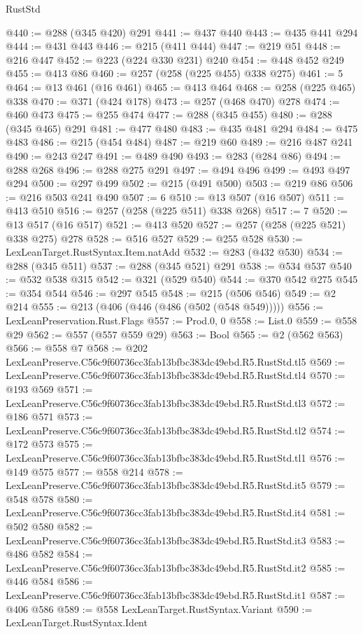 \begin{lexlean}{RustStd}
\begin{coremodule}
@440 := @288 (@345 @420) @291
@441 := @437 @440
@443 := @435 @441 @294
@444 := @431 @443
@446 := @215 (@411 @444)
@447 := @219 @51
@448 := @216 @447
@452 := @223 (@224 @330 @231) @240
@454 := @448 @452 @249
@455 := @413 @86
@460 := @257 (@258 (@225 @455) @338 @275)
@461 := 5
@464 := @13 @461 (@16 @461)
@465 := @413 @464
@468 := @258 (@225 @465) @338
@470 := @371 (@424 @178)
@473 := @257 (@468 @470) @278
@474 := @460 @473
@475 := @255 @474
@477 := @288 (@345 @455)
@480 := @288 (@345 @465) @291
@481 := @477 @480
@483 := @435 @481 @294
@484 := @475 @483
@486 := @215 (@454 @484)
@487 := @219 @60
@489 := @216 @487 @241
@490 := @243 @247
@491 := @489 @490
@493 := @283 (@284 @86)
@494 := @288 @268
@496 := @288 @275 @291
@497 := @494 @496
@499 := @493 @497 @294
@500 := @297 @499
@502 := @215 (@491 @500)
@503 := @219 @86
@506 := @216 @503 @241 @490
@507 := 6
@510 := @13 @507 (@16 @507)
@511 := @413 @510
@516 := @257 (@258 (@225 @511) @338 @268)
@517 := 7
@520 := @13 @517 (@16 @517)
@521 := @413 @520
@527 := @257 (@258 (@225 @521) @338 @275) @278
@528 := @516 @527
@529 := @255 @528
@530 := LexLeanTarget.RustSyntax.Item.natAdd
@532 := @283 (@432 @530)
@534 := @288 (@345 @511)
@537 := @288 (@345 @521) @291
@538 := @534 @537
@540 := @532 @538 @315
@542 := @321 (@529 @540)
@544 := @370 @542 @275
@545 := @354 @544
@546 := @297 @545
@548 := @215 (@506 @546)
@549 := @2 @214
@555 := @213 (@406 (@446 (@486 (@502 (@548 @549)))))
@556 := LexLeanPreservation.Rust.Flags
@557 := Prod.{0, 0}
@558 := List.{0}
@559 := @558 @29
@562 := @557 (@557 @559 @29)
@563 := Bool
@565 := @2 (@562 @563)
@566 := @558 @7
@568 := @202 LexLeanPreserve.C56c9f60736cc3fab13bfbc383dc49ebd.R5.RustStd.tl5
@569 := LexLeanPreserve.C56c9f60736cc3fab13bfbc383dc49ebd.R5.RustStd.tl4
@570 := @193 @569
@571 := LexLeanPreserve.C56c9f60736cc3fab13bfbc383dc49ebd.R5.RustStd.tl3
@572 := @186 @571
@573 := LexLeanPreserve.C56c9f60736cc3fab13bfbc383dc49ebd.R5.RustStd.tl2
@574 := @172 @573
@575 := LexLeanPreserve.C56c9f60736cc3fab13bfbc383dc49ebd.R5.RustStd.tl1
@576 := @149 @575
@577 := @558 @214
@578 := LexLeanPreserve.C56c9f60736cc3fab13bfbc383dc49ebd.R5.RustStd.it5
@579 := @548 @578
@580 := LexLeanPreserve.C56c9f60736cc3fab13bfbc383dc49ebd.R5.RustStd.it4
@581 := @502 @580
@582 := LexLeanPreserve.C56c9f60736cc3fab13bfbc383dc49ebd.R5.RustStd.it3
@583 := @486 @582
@584 := LexLeanPreserve.C56c9f60736cc3fab13bfbc383dc49ebd.R5.RustStd.it2
@585 := @446 @584
@586 := LexLeanPreserve.C56c9f60736cc3fab13bfbc383dc49ebd.R5.RustStd.it1
@587 := @406 @586
@589 := @558 LexLeanTarget.RustSyntax.Variant
@590 := LexLeanTarget.RustSyntax.Ident

\end{coremodule}
\end{lexlean}
